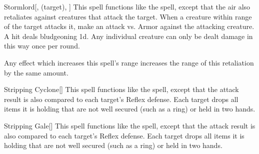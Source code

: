 \lowercase{\hypertarget{spell:Stormlord}{}}\label{spell:Stormlord}
\begin{attuneability}[\nth{3}]{\hypertarget{spell:Stormlord}{Stormlord}}[,  (target), ]
This spell functions like the  spell, except that the air also retaliates against creatures that attack the target.
When a creature within \rngclose range of the target attacks it, make an attack vs. Armor against the attacking creature.
A hit deals bludgeoning  \minus1d.
Any individual creature can only be dealt damage in this way once per round.

Any effect which increases this spell's range increases the range of this retaliation by the same amount.
\end{attuneability}
\vspace{0.25em}



\lowercase{\hypertarget{spell:Stripping Cyclone}{}}\label{spell:Stripping Cyclone}
\begin{freeability}[\nth{3}]{\hypertarget{spell:Stripping Cyclone}{Stripping Cyclone}}[]
This spell functions like the  spell, except that the attack result is also compared to each target's Reflex defense.
\hit Each target drops all items it is holding that are not well secured (such as a ring) or held in two hands.
\end{freeability}
\vspace{0.25em}



\lowercase{\hypertarget{spell:Stripping Gale}{}}\label{spell:Stripping Gale}
\begin{freeability}[\nth{3}]{\hypertarget{spell:Stripping Gale}{Stripping Gale}}[]
This spell functions like the  spell, except that the attack result is also compared to each target's Reflex defense.
\hit Each target drops all items it is holding that are not well secured (such as a ring) or held in two hands.
\end{freeability}
\vspace{0.25em}



